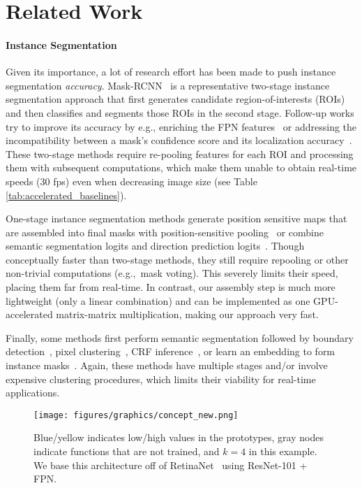 \documentclass[10pt,journal,compsoc]{IEEEtran}
\begin{document}
\section{Related Work}


\paragraph{Instance Segmentation}
Given its importance, a lot of research effort has been made to push instance segmentation \emph{accuracy}. Mask-RCNN~\cite{maskrcnn} is a representative two-stage instance segmentation approach that first generates candidate region-of-interests (ROIs) and then classifies and segments those ROIs in the second stage. Follow-up works try to improve its accuracy by e.g., enriching the FPN features~\cite{liu-panet2018} or addressing the incompatibility between a mask's confidence score and its localization accuracy~\cite{huang-msrcnn2018}. These two-stage methods require re-pooling features for each ROI and processing them with subsequent computations, which make them unable to obtain real-time speeds (30 fps) even when decreasing image size (see Table \ref{tab:accelerated_baselines}).

One-stage instance segmentation methods generate position sensitive maps that are assembled into final masks with position-sensitive pooling~\cite{dai-eccv2016,fcis} or combine semantic segmentation logits and direction prediction logits~\cite{chen-masklab2018}. Though conceptually faster than two-stage methods, they still require repooling or other non-trivial computations (e.g.,~mask voting). This severely limits their speed, placing them far from real-time. In contrast, our assembly step is much more lightweight (only a linear combination) and can be implemented as one GPU-accelerated matrix-matrix multiplication, making our approach very fast.

Finally, some methods first perform semantic segmentation followed by boundary detection~\cite{kirillov-cvpr2017}, pixel clustering~\cite{bai-cvpr2017,liang-pami2018}, CRF inference~\cite{arnab-cvpr2017}, or learn an embedding to form instance masks~\cite{newell-nips2017,harley-iccv2017,de-arxiv2017,fathi-arxiv2017}. Again, these methods have multiple stages and/or involve expensive clustering procedures, which limits their viability for real-time applications.

    \begin{figure*}
    \centering
\texttt{[image: figures/graphics/concept\_new.png]}
\caption{ Blue/yellow indicates low/high values in the prototypes, gray nodes indicate functions that are not trained, and $k=4$ in this example. We base this architecture off of RetinaNet~\cite{retinanet} using ResNet-101 + FPN.}
\label{fig:concept}
\end{figure*} 
\end{document}
